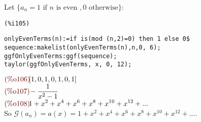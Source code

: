 Let $\{a_n = 1 \text{ if } n \text{ is even }, 0 \text{ otherwise}\}$:\\
\noindent
\begin{minipage}[t]{8ex}{\color{red}\bf
\begin{verbatim}
(%i105)
\end{verbatim}}
\end{minipage}
\begin{minipage}[t]{\textwidth}{\color{blue}
\begin{verbatim}
onlyEvenTerms(n):=if is(mod (n,2)=0) then 1 else 0$
sequence:makelist(onlyEvenTerms(n),n,0, 6);
ggfOnlyEvenTerms:ggf(sequence);
taylor(ggfOnlyEvenTerms, x, 0, 12);
\end{verbatim}}
\end{minipage}
\begin{math}\displaystyle
\parbox{8ex}{\color{labelcolor}(\%o106) }
[1,0,1,0,1,0,1]
\end{math}\\
\begin{math}\displaystyle
\parbox{8ex}{\color{labelcolor}(\%o107) }
-\frac{1}{{x}^{2}-1}
\end{math}\\
\begin{math}\displaystyle
\parbox{8ex}{\color{labelcolor}(\%o108) }
1+{x}^{2}+{x}^{4}+{x}^{6}+{x}^{8}+{x}^{10}+{x}^{12}+...
\end{math}\\
So $\mathcal{G}(a_n) =
a(x)=1+{x}^{2}+{x}^{4}+{x}^{6}+{x}^{8}+{x}^{10}+{x}^{12}+...$.\\

